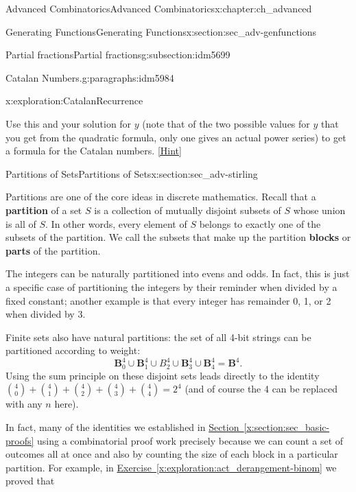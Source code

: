 \documentclass[oneside,10pt,]{book}
\newcommand{\terminology}[1]{\textbf{#1}}
\numberwithin{equation}{chapter}
\def\B{\mathbf{B}}
\begin{document}
\begin{chapterptx}{Advanced Combinatorics}{}{Advanced Combinatorics}{}{}{x:chapter:ch_advanced}
\begin{sectionptx}{Generating Functions}{}{Generating Functions}{}{}{x:section:sec_adv-genfunctions}
\begin{subsectionptx}{Partial fractions}{}{Partial fractions}{}{}{g:subsection:idm5699}
\begin{paragraphs}{Catalan Numbers.}{g:paragraphs:idm5984}
\begin{exploration}{}{x:exploration:CatalanRecurrence}
\begin{enumerate}[font=\bfseries,label=(\alph*),ref=\alph*]
\begin{equation*}
\end{equation*}
Use this and your solution for \(y\) (note that of the two possible values for \(y\) that you get from the quadratic formula, only one gives an actual power series) to get a formula for the Catalan numbers.%
\space\hspace*{0pt}\hfill{\tiny\hyperlink{g:hint:idm6027-back}{[Hint]}}\end{enumerate}
\end{exploration}
\end{paragraphs}%
\end{subsectionptx}
\end{sectionptx}
%
%
\typeout{************************************************}
\typeout{************************************************}
%
\begin{sectionptx}{Partitions of Sets}{}{Partitions of Sets}{}{}{x:section:sec_adv-stirling}
\begin{introduction}{}%
Partitions are one of the core ideas in discrete mathematics.  Recall that a \terminology{partition} of a set \(S\) is a collection of mutually disjoint subsets of \(S\) whose union is all of \(S\).  In other words, every element of \(S\) belongs to exactly one of the subsets of the partition.  We call the subsets that make up the partition \terminology{blocks} or \terminology{parts} of the partition.%
\par
The integers can be naturally partitioned into evens and odds.  In fact, this is just a specific case of partitioning the integers by their reminder when divided by a fixed constant; another example is that every integer has remainder 0, 1, or 2 when divided by 3.%
\par
Finite sets also have natural partitions: the set of all 4-bit strings can be partitioned according to weight:%
\begin{equation*}
\B^4_0 \cup \B^4_1 \cup B^4_2 \cup \B^4_3 \cup \B^4_4 = \B^4\text{.}
\end{equation*}
Using the sum principle on these disjoint sets leads directly to the identity \(\binom{4}{0} + \binom{4}{1} + \binom{4}{2} + \binom{4}{3} + \binom{4}{4} = 2^4\) (and of course the 4 can be replaced with any \(n\) here).%
\par
In fact, many of the identities we established in \hyperref[x:section:sec_basic-proofs]{Section~\ref{x:section:sec_basic-proofs}} using a combinatorial proof work precisely because we can count a set of outcomes all at once and also by counting the size of each block in a particular partition.  For example, in \hyperref[x:exploration:act_derangement-binom]{Exercise~\ref{x:exploration:act_derangement-binom}} we proved that%

\end{introduction}
\end{sectionptx}
\end{chapterptx}
\end{document}
